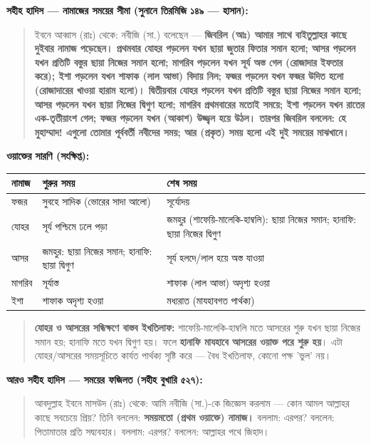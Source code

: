 \textbf{সহীহ হাদিস — নামাজের সময়ের সীমা (সুনানে তিরমিজি ১৪৯ — হাসান):}

\begin{quote}
ইবনে আব্বাস (রাঃ) থেকে: নবীজি (সা.) বলেছেন — \textbf{জিবরিল (আঃ) আমার সাথে বাইতুল্লাহর কাছে দুইবার নামাজ পড়েছেন। প্রথমবার যোহর পড়লেন যখন ছায়া জুতার ফিতার সমান হলো; আসর পড়লেন যখন প্রতিটি বস্তুর ছায়া নিজের সমান হলো; মাগরিব পড়লেন যখন সূর্য অস্ত গেল (রোজাদার ইফতার করে); ইশা পড়লেন যখন শাফাক (লাল আভা) বিদায় নিল; ফজর পড়লেন যখন ফজর উদিত হলো (রোজাদারের খাওয়া হারাম হলো)। দ্বিতীয়বার যোহর পড়লেন যখন প্রতিটি বস্তুর ছায়া নিজের সমান হলো; আসর পড়লেন যখন ছায়া নিজের দ্বিগুণ হলো; মাগরিব প্রথমবারের মতোই সময়ে; ইশা পড়লেন যখন রাতের এক-তৃতীয়াংশ গেল; ফজর পড়লেন যখন (আকাশ) উজ্জ্বল হয়ে উঠল। তারপর জিবরিল বললেন: হে মুহাম্মাদ! এগুলো তোমার পূর্ববর্তী নবীদের সময়; আর (প্রকৃত) সময় হলো এই দুই সময়ের মাঝখানে।}
\end{quote}

\textbf{ওয়াক্তের সারণি (সংক্ষিপ্ত):}

\begin{table}[h]\centering\small
\begin{tabular}{lll}
নামাজ & শুরুর সময় & শেষ সময় \\
\hline
ফজর & সুবহে সাদিক (ভোরের সাদা আলো) & সূর্যোদয় \\
যোহর & সূর্য পশ্চিমে ঢলে পড়া & জমহুর (শাফেয়ি-মালেকি-হাম্বলি): ছায়া নিজের সমান; হানাফি: ছায়া নিজের দ্বিগুণ \\
আসর & জমহুর: ছায়া নিজের সমান; হানাফি: ছায়া দ্বিগুণ & সূর্য হলদে/লাল হয়ে অস্ত যাওয়া \\
মাগরিব & সূর্যাস্ত & শাফাক (লাল আভা) অদৃশ্য হওয়া \\
ইশা & শাফাক অদৃশ্য হওয়া & মধ্যরাত (মাযহাবগত পার্থক্য) \\
\hline
\end{tabular}
\end{table}

\begin{quote}
\textbf{যোহর ও আসরের সন্ধিক্ষণে বাস্তব ইখতিলাফ:} শাফেয়ি-মালেকি-হাম্বলি মতে আসরের শুরু যখন ছায়া নিজের সমান হয়; হানাফি মতে যখন দ্বিগুণ হয়। ফলে \textbf{হানাফি মাযহাবে আসরের ওয়াক্ত পরে শুরু হয়}। এটা যোহর/আসরের সময়সূচিতে কার্যত পার্থক্য সৃষ্টি করে — বৈধ ইখতিলাফ, কোনো পক্ষ 'ভুল' নয়।
\end{quote}

\textbf{আরও সহীহ হাদিস — সময়ের ফজিলত (সহীহ বুখারি ৫২৭):}

\begin{quote}
আবদুল্লাহ ইবনে মাসউদ (রাঃ) থেকে: আমি নবীজি (সা.)-কে জিজ্ঞেস করলাম — কোন আমল আল্লাহর কাছে সবচেয়ে প্রিয়? তিনি বললেন: \textbf{সময়মতো (প্রথম ওয়াক্তে) নামাজ।} বললাম: এরপর? বললেন: পিতামাতার প্রতি সদ্ব্যবহার। বললাম: এরপর? বললেন: আল্লাহর পথে জিহাদ।
\end{quote}

